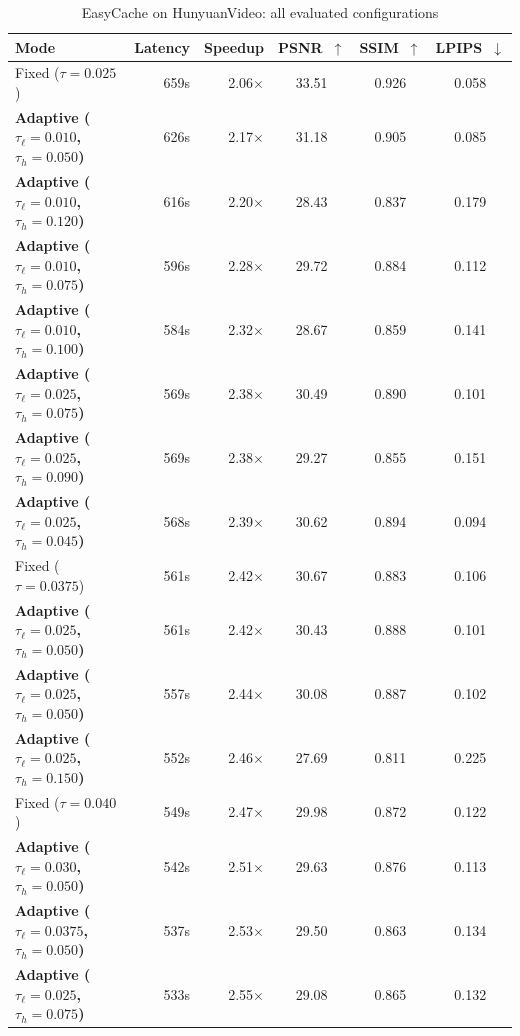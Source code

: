 \begin{table}[htbp]
\centering
\footnotesize
\setlength{\tabcolsep}{5pt}
\caption{EasyCache on HunyuanVideo: all evaluated configurations}
\label{tab:app-ec-hv}
\begin{tabular}{lrrccc}
\toprule
\textbf{Mode} & \textbf{Latency} & \textbf{Speedup} & \textbf{PSNR~$\uparrow$} & \textbf{SSIM~$\uparrow$} & \textbf{LPIPS~$\downarrow$} \\
\midrule
  Fixed ($\tau=0.025$) & 659s & 2.06$\times$ & 33.51 & 0.926 & 0.058 \\
  \textbf{Adaptive ($\tau_\ell=0.010$, $\tau_h=0.050$)} & 626s & 2.17$\times$ & 31.18 & 0.905 & 0.085 \\
  \textbf{Adaptive ($\tau_\ell=0.010$, $\tau_h=0.120$)} & 616s & 2.20$\times$ & 28.43 & 0.837 & 0.179 \\
  \textbf{Adaptive ($\tau_\ell=0.010$, $\tau_h=0.075$)} & 596s & 2.28$\times$ & 29.72 & 0.884 & 0.112 \\
  \textbf{Adaptive ($\tau_\ell=0.010$, $\tau_h=0.100$)} & 584s & 2.32$\times$ & 28.67 & 0.859 & 0.141 \\
  \textbf{Adaptive ($\tau_\ell=0.025$, $\tau_h=0.075$)} & 569s & 2.38$\times$ & 30.49 & 0.890 & 0.101 \\
  \textbf{Adaptive ($\tau_\ell=0.025$, $\tau_h=0.090$)} & 569s & 2.38$\times$ & 29.27 & 0.855 & 0.151 \\
  \textbf{Adaptive ($\tau_\ell=0.025$, $\tau_h=0.045$)} & 568s & 2.39$\times$ & 30.62 & 0.894 & 0.094 \\
  Fixed ($\tau=0.0375$) & 561s & 2.42$\times$ & 30.67 & 0.883 & 0.106 \\
  \textbf{Adaptive ($\tau_\ell=0.025$, $\tau_h=0.050$)} & 561s & 2.42$\times$ & 30.43 & 0.888 & 0.101 \\
  \textbf{Adaptive ($\tau_\ell=0.025$, $\tau_h=0.050$)} & 557s & 2.44$\times$ & 30.08 & 0.887 & 0.102 \\
  \textbf{Adaptive ($\tau_\ell=0.025$, $\tau_h=0.150$)} & 552s & 2.46$\times$ & 27.69 & 0.811 & 0.225 \\
  Fixed ($\tau=0.040$) & 549s & 2.47$\times$ & 29.98 & 0.872 & 0.122 \\
  \textbf{Adaptive ($\tau_\ell=0.030$, $\tau_h=0.050$)} & 542s & 2.51$\times$ & 29.63 & 0.876 & 0.113 \\
  \textbf{Adaptive ($\tau_\ell=0.0375$, $\tau_h=0.050$)} & 537s & 2.53$\times$ & 29.50 & 0.863 & 0.134 \\
  \textbf{Adaptive ($\tau_\ell=0.025$, $\tau_h=0.075$)} & 533s & 2.55$\times$ & 29.08 & 0.865 & 0.132 \\

\end{tabular}
\end{table}
